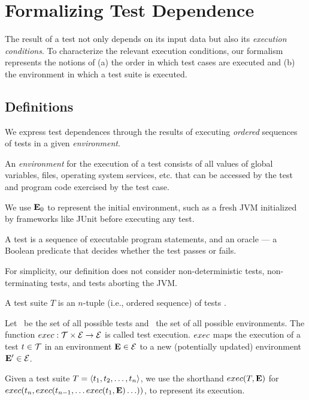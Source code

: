 
\section{Formalizing Test Dependence}
\label{sec:formalism}


The result of a test not only depends on
its input data but also its \emph{execution conditions}.
To characterize the relevant execution conditions, 
our formalism represents the notions of
(a) the order in which test cases are executed and (b) the environment in which a test suite is executed.  


\subsection{Definitions}
\label{sec:definitions}

We express test dependences through the results of executing
\emph{ordered} sequences of tests in a given \emph{environment}.


\begin{definition}[Environment]
An \emph{environment} \env for the execution of a test
consists of all values of global variables, files,
operating
system services, etc. that
can be accessed by the test and program code exercised by the test
case.
\end{definition}

We use $\mathbf{E}_0$ to represent the initial environment, such
as a fresh JVM initialized by frameworks like JUnit
before executing any test.


\begin{definition}[Test]

A test is a sequence of executable program statements, and an oracle
--- a Boolean predicate that
decides whether the test passes or fails.
\end{definition}

For simplicity, our definition does not consider non-deterministic
tests, non-terminating tests, and tests aborting the JVM.


\begin{definition}
A test suite\/ $T$ is an $n$-tuple (i.e., ordered sequence) of tests
.

\end{definition}


\begin{definition}
Let\/ \alltests\ be the set of all possible
tests and\/ \environs\ the set of all possible
environments.
The function\/ $exec: \mathcal{T} \times \mathcal{E} \rightarrow
\mathcal{E}$ is called test
execution. $exec$ maps the execution of a test\/ $ t \in
\mathcal{T}$ 
in an environment\/ $\mathbf{E} \in \mathcal{E}$ to a new (potentially updated)
environment\/ $\mathbf{E}' \in \mathcal{E}$.

Given a test suite\/ $T =  \langle t_1, t_2, \dots, t_n \rangle $,
we use the shorthand\/
$exec(T,\mathbf{E})$ for $exec(t_n,exec(t_{n-1},{\dots exec(t_1,\mathbf{E}) \dots }))$, to represent its execution.
\end{definition}

